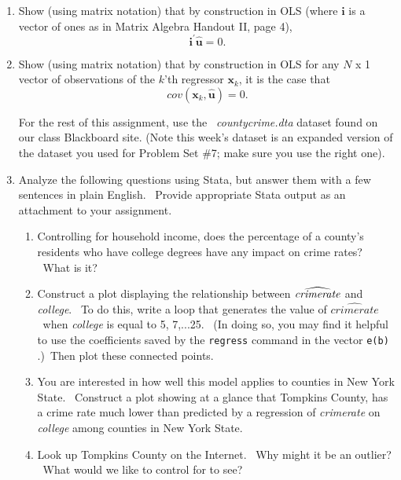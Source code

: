 \documentclass[11pt]{article}
\begin{document}
\begin{enumerate}
\item Show (using matrix notation) that by construction in OLS (where $%
\mathbf{i}$ is a vector of ones as in Matrix Algebra Handout II, page 4), 
\begin{equation*}
\mathbf{i}^{\prime }\widehat{\mathbf{u}}=0.
\end{equation*}

\item Show (using matrix notation) that by construction in OLS for any $N$ x
1 vector of observations of the $k$'th regressor $\mathbf{x}_{k}$, it is the
case that%
\begin{equation*}
cov\left( \mathbf{x}_{k},\widehat{\mathbf{u}}\right) =0.
\end{equation*}%
\bigskip 

For the rest of this assignment, use the \textit{\ countycrime.dta} dataset
found on our class Blackboard site. (Note this week's dataset is an expanded
version of the dataset you used for Problem Set \#7; make sure you use the
right one).

\item Analyze the following questions using Stata, but answer them with a
few sentences in plain English. \ Provide appropriate Stata output as an
attachment to your assignment.

\begin{enumerate}
\item Controlling for household income, does the percentage of a county's
residents who have college degrees have any impact on crime rates? \ What is
it?

\item Construct a plot displaying the relationship between $\widehat{\mathit{%
crimerate}}$ and \textit{college}. \ To do this, write a loop that generates
the value of $\widehat{\mathit{crimerate}}$ \ when \textit{college }is equal
to 5, 7,...25. \ (In doing so, you may find it helpful to use the
coefficients saved by the \texttt{regress} command in the vector \texttt{e(b)%
}.)\ Then plot these connected points.

\item You are interested in how well this model applies to counties in New
York State. \ Construct a plot showing at a glance that Tompkins County, has
a crime rate much lower than predicted by a regression of \textit{crimerate}
on \textit{college }among counties in New York State.

\item Look up Tompkins County on the Internet. \ Why might it be an outlier?
\ What would we like to control for to see?\bigskip
\end{enumerate}


\end{enumerate}
\end{document}
